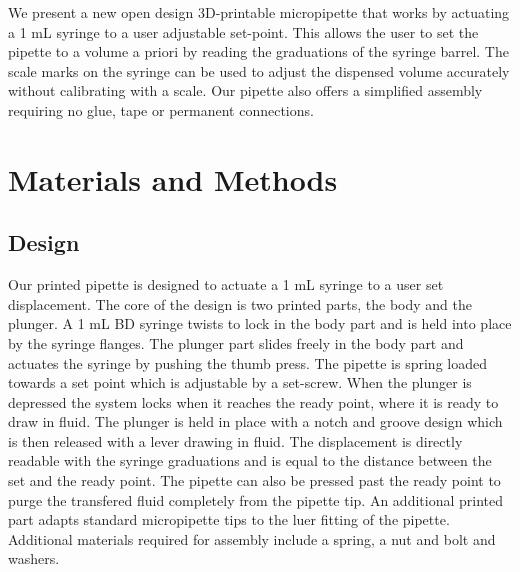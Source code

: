 \documentclass[10pt,letterpaper]{article}
\begin{document}
We present a new open design 3D-printable micropipette that works by actuating a 1 mL syringe to a user adjustable set-point.
This allows the user to set the pipette to a volume a priori by reading the graduations of the syringe barrel.
The scale marks on the syringe can be used to adjust the dispensed volume accurately without calibrating with a scale.
Our pipette also offers a simplified assembly requiring no glue, tape or permanent connections. 





\section*{Materials and Methods}
\subsection*{Design}

Our printed pipette is designed to actuate a 1 mL syringe to a user set displacement.
The core of the design is two printed parts, the body and the plunger.
A 1 mL BD syringe twists to lock in the body part and is held into place by the syringe flanges.
The plunger part slides freely in the body part and actuates the syringe by pushing the thumb press. 
The pipette is spring loaded towards a set point which is adjustable by a set-screw. 
When the plunger is depressed the system locks when it reaches the ready point, where it is ready to draw in fluid.
The plunger is held in place with a notch and groove design which is then released with a lever drawing in fluid. 
The displacement is directly readable with the syringe graduations and is equal to the distance between the set and the ready point.
The pipette can also be pressed past the ready point to purge the transfered fluid completely from the pipette tip.   
An additional printed part adapts standard micropipette tips to the luer fitting of the pipette.
Additional materials required for assembly include a spring, a nut and bolt and washers.
\end{document}
